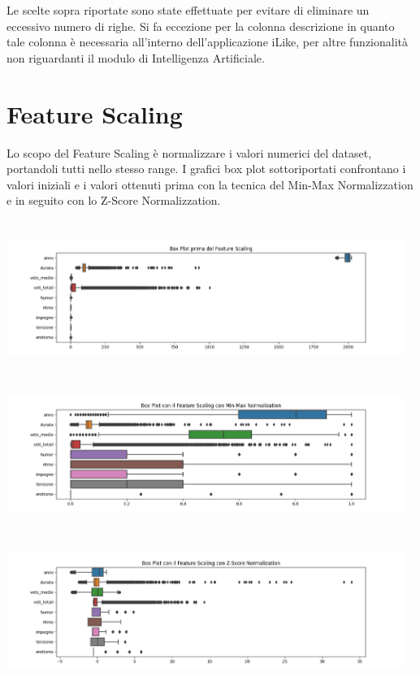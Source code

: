 \documentclass[a4paper, 10pt]{report}
\begin{document}
            Le scelte sopra riportate sono state effettuate per evitare di eliminare un eccessivo numero di righe.
            Si fa eccezione per la colonna descrizione in quanto tale colonna è necessaria all'interno dell'applicazione
            iLike, per altre funzionalità non riguardanti il modulo di Intelligenza Artificiale.

        \section{Feature Scaling}\label{sec:feature-scaling}
            Lo scopo del Feature Scaling è normalizzare i valori numerici del dataset, portandoli tutti nello stesso range.
            I grafici box plot sottoriportati confrontano i valori iniziali e i valori ottenuti prima con la tecnica del
            Min-Max Normalizzation e in seguito con lo Z-Score Normalizzation.

            \begin{center}
                \includegraphics[width=13cm, height=5cm]{dataPreparation/noScaling.png}\\
                \includegraphics[width=13cm, height=5cm]{dataPreparation/minMax.png}\\
                \includegraphics[width=13cm, height=5cm]{dataPreparation/zScore.png}\\
            \end{center}
\end{document}
